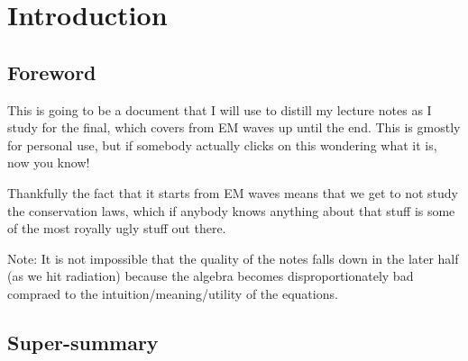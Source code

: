 \documentclass[10pt,twocolumn]{article}
\begin{document}
\pagestyle{fancy}
\cfoot{\thepage/\pageref{LastPage}}

\tableofcontents
\newpage

\section{Introduction}

\subsection{Foreword}

This is going to be a document that I will use to distill my lecture notes as I study for the final, which covers from EM waves up until the end. This is gmostly for personal use, but if somebody actually clicks on this wondering what it is, now you know!

Thankfully the fact that it starts from EM waves means that we get to not study the conservation laws, which if anybody knows anything about that stuff is some of the most royally ugly stuff out there.

Note: It is not impossible that the quality of the notes falls down in the later half (as we hit radiation) because the algebra becomes disproportionately bad compraed to the intuition/meaning/utility of the equations. 

\subsection{Super-summary}
\end{document}
